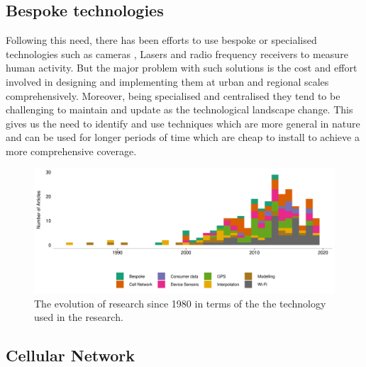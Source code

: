 \subsection{Bespoke technologies}

Following this need, there has been efforts to use bespoke or specialised technologies such as cameras \citep{cai1996, heikkila2004, krockel2012}, Lasers \citep{zhao2005, arras2008} and radio frequency receivers  \citep{bahl2000, yang2013, chothia2010, bulusu2000, dil2011} to measure human activity.
But the major problem with such solutions is the cost and effort involved in designing and implementing them at urban and regional scales comprehensively.
Moreover, being specialised and centralised they tend to be challenging to maintain and update as the technological landscape change.
This gives us the need to identify and use techniques which are more general in nature and can be used for longer periods of time which are cheap to install to achieve a more comprehensive coverage.

\begin{figure}
  \includegraphics{images/literature-tech-timeline.png}
  \caption{The evolution of research since 1980 in terms of the the technology used in the research.}
  \label{figure:literature:tech:timeline}
\end{figure}


\subsection{Cellular Network}

